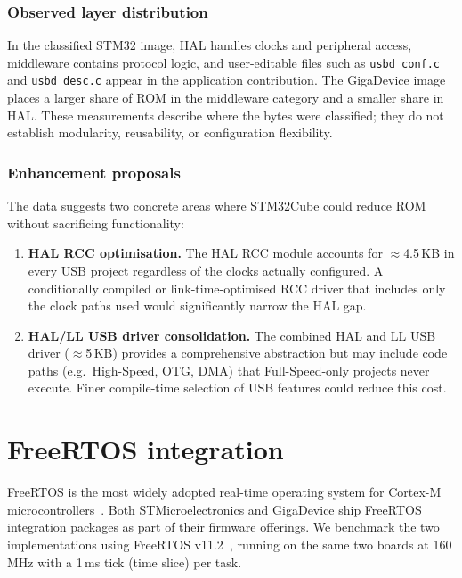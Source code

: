 \subsubsection*{Observed layer distribution}
In the classified STM32 image, HAL handles clocks and peripheral access, middleware contains
protocol logic, and user-editable files such as \texttt{usbd\_conf.c} and
\texttt{usbd\_desc.c} appear in the application contribution. The GigaDevice image places a
larger share of ROM in the middleware category and a smaller share in HAL. These measurements
describe where the bytes were classified; they do not establish modularity, reusability, or
configuration flexibility.

\subsubsection*{Enhancement proposals}
The data suggests two concrete areas where STM32Cube could reduce ROM without sacrificing
functionality:

\begin{enumerate}
  \item \textbf{HAL RCC optimisation.} The HAL RCC module accounts for $\approx$4.5\,KB in
    every USB project regardless of the clocks actually configured. A conditionally compiled
    or link-time-optimised RCC driver that includes only the clock paths used would
    significantly narrow the HAL gap.
  \item \textbf{HAL/LL USB driver consolidation.} The combined HAL and LL USB driver
    ($\approx$5\,KB) provides a comprehensive abstraction but may include code paths
    (e.g.\ High-Speed, OTG, DMA) that Full-Speed-only projects never execute. Finer
    compile-time selection of USB features could reduce this cost.
\end{enumerate}

\section{FreeRTOS integration}
\label{sec:gd32-freertos}

FreeRTOS is the most widely adopted real-time operating system for Cortex-M
microcontrollers~\cite{freertos}. Both STMicroelectronics and GigaDevice ship FreeRTOS
integration packages as part of their firmware offerings. We benchmark the two
implementations using FreeRTOS v11.2~\cite{freertos-v11}, running on the same two boards
at 160\,MHz with a 1\,ms tick (time slice) per task.

